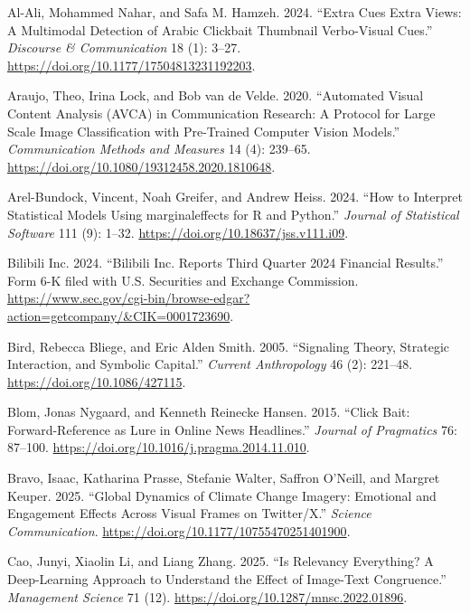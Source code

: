 \documentclass[
  12pt,
]{article}
\newlength{\cslhangindent}
\newenvironment{CSLReferences}[2] %
 {\begin{list}{}{%
  \setlength{\itemindent}{0pt}
  \setlength{\leftmargin}{0pt}
  \setlength{\parsep}{0pt}
  \ifodd #1
   \setlength{\leftmargin}{\cslhangindent}
   \setlength{\itemindent}{-1\cslhangindent}
  \fi
  \setlength{\itemsep}{#2\baselineskip}}}
 {\end{list}}
\begin{document}
\protect{}\label{refs}
\begin{CSLReferences}{1}{0}
Al-Ali, Mohammed Nahar, and Safa M. Hamzeh. 2024. {``Extra Cues Extra
Views: A Multimodal Detection of {Arabic} Clickbait Thumbnail
Verbo-Visual Cues.''} \emph{Discourse \& Communication} 18 (1): 3--27.
\url{https://doi.org/10.1177/17504813231192203}.

Araujo, Theo, Irina Lock, and Bob van de Velde. 2020. {``Automated
Visual Content Analysis ({AVCA}) in Communication Research: A Protocol
for Large Scale Image Classification with Pre-Trained Computer Vision
Models.''} \emph{Communication Methods and Measures} 14 (4): 239--65.
\url{https://doi.org/10.1080/19312458.2020.1810648}.

Arel-Bundock, Vincent, Noah Greifer, and Andrew Heiss. 2024. {``How to
Interpret Statistical Models Using {marginaleffects} for {R} and
{Python}.''} \emph{Journal of Statistical Software} 111 (9): 1--32.
\url{https://doi.org/10.18637/jss.v111.i09}.

Bilibili Inc. 2024. {``Bilibili Inc. Reports Third Quarter 2024
Financial Results.''} Form 6-K filed with U.S. Securities and Exchange
Commission.
\url{https://www.sec.gov/cgi-bin/browse-edgar?action=getcompany/&CIK=0001723690}.

Bird, Rebecca Bliege, and Eric Alden Smith. 2005. {``Signaling Theory,
Strategic Interaction, and Symbolic Capital.''} \emph{Current
Anthropology} 46 (2): 221--48. \url{https://doi.org/10.1086/427115}.

Blom, Jonas Nygaard, and Kenneth Reinecke Hansen. 2015. {``Click Bait:
Forward-Reference as Lure in Online News Headlines.''} \emph{Journal of
Pragmatics} 76: 87--100.
\url{https://doi.org/10.1016/j.pragma.2014.11.010}.

Bravo, Isaac, Katharina Prasse, Stefanie Walter, Saffron O'Neill, and
Margret Keuper. 2025. {``Global Dynamics of Climate Change Imagery:
Emotional and Engagement Effects Across Visual Frames on
{Twitter}/{X}.''} \emph{Science Communication}.
\url{https://doi.org/10.1177/10755470251401900}.

Cao, Junyi, Xiaolin Li, and Liang Zhang. 2025. {``Is Relevancy
Everything? {A} Deep-Learning Approach to Understand the Effect of
Image-Text Congruence.''} \emph{Management Science} 71 (12).
\url{https://doi.org/10.1287/mnsc.2022.01896}.


\end{CSLReferences}
\end{document}
